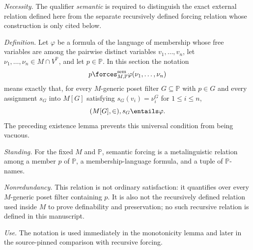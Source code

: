 \begin{definition}
\emph{Necessity.}
The qualifier \emph{semantic} is required to distinguish the exact external
relation defined here from the separate recursively defined forcing relation
whose construction is only cited below.

\emph{Definition.}
Let \(\varphi\) be a formula of the language of membership whose free variables
are among the pairwise distinct variables \(v_1,\ldots,v_n\), let
\(\nu_1,\ldots,\nu_n\in M\cap V^{\mathbb P}\), and let \(p\in\mathbb P\).
In this section the notation
\[
  p\forces^{\mathrm{sem}}_{M,\mathbb P}
    \varphi(\nu_1,\ldots,\nu_n)
\]
means exactly that, for every \(M\)-generic poset filter
\(G\subseteq\mathbb P\) with \(p\in G\) and every assignment \(s_G\) into
\(M[G]\) satisfying \(s_G(v_i)=\nu_i^G\) for \(1\leq i\leq n\),
\[
  (M[G],\in),s_G\entails\varphi.
\]
The preceding existence lemma prevents this universal condition from being
vacuous.

\emph{Standing.}
For the fixed \(M\) and \(\mathbb P\), semantic forcing is a metalinguistic
relation among a member \(p\) of \(\mathbb P\), a membership-language formula,
and a tuple of \(\mathbb P\)-names.

\emph{Nonredundancy.}
This relation is not ordinary satisfaction: it quantifies over every
\(M\)-generic poset filter containing \(p\).  It is also not the recursively
defined relation used inside \(M\) to prove definability and preservation;
no such recursive relation is defined in this manuscript.

\emph{Use.}
The notation is used immediately in the monotonicity lemma and later in the
source-pinned comparison with recursive forcing.
\end{definition}

